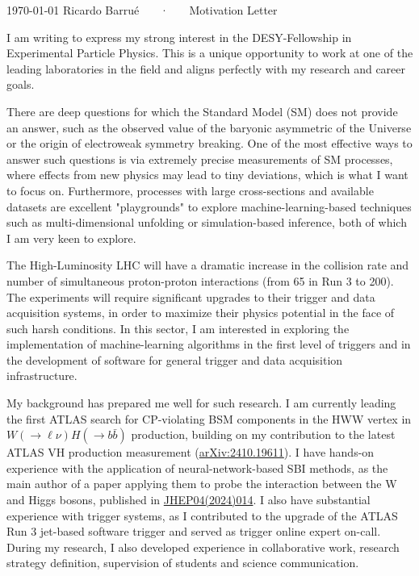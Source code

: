 \documentclass[11pt, a4paper]{awesome-cv}
\begin{document}
\makecvheader[R]

\makecvfooter
  {\today}
  {Ricardo Barrué ~~~·~~~ Motivation Letter}
  {}

\makelettertitle

\begin{cvletter}

I am writing to express my strong interest in the DESY-Fellowship in Experimental Particle Physics. This is a unique opportunity to work at one of the leading laboratories in the field and aligns perfectly with my research and career goals.

There are deep questions for which the Standard Model (SM) does not provide an answer, such as the observed value of the baryonic asymmetric of the Universe or the origin of electroweak symmetry breaking. One of the most effective ways to answer such questions is via extremely precise measurements of SM processes, where effects from new physics may lead to tiny deviations, which is what I want to focus on. Furthermore, processes with large cross-sections and available datasets are excellent "playgrounds" to explore machine-learning-based techniques such as multi-dimensional unfolding or simulation-based inference, both of which I am very keen to explore.

The High-Luminosity LHC will have a dramatic increase in the collision rate and number of simultaneous proton-proton interactions (from 65 in Run 3 to 200). The experiments will require significant upgrades to their trigger and data acquisition systems, in order to maximize their physics potential in the face of such harsh conditions. In this sector, I am interested in exploring the implementation of machine-learning algorithms in the first level of triggers and in the development of software for general trigger and data acquisition infrastructure.

My background has prepared me well for such research. I am currently leading the first ATLAS search for CP-violating BSM components in the HWW vertex in $W(\to \ell \nu)H(\to b\bar{b})$ production, building on my contribution to the latest ATLAS VH production measurement (\href{https://arxiv.org/abs/2410.19611}{arXiv:2410.19611}). I have hands-on experience with the application of neural-network-based SBI methods, as the main author of a paper applying them to probe the interaction between the W and Higgs bosons, published in \href{http://dx.doi.org/10.1007/JHEP04(2024)014}{JHEP04(2024)014}. I also have substantial experience with trigger systems, as I contributed to the upgrade of the ATLAS Run 3 jet-based software trigger and served as trigger online expert on-call. During my research, I also developed experience in collaborative work, research strategy definition, supervision of students and science communication.


\end{cvletter}
\end{document}
